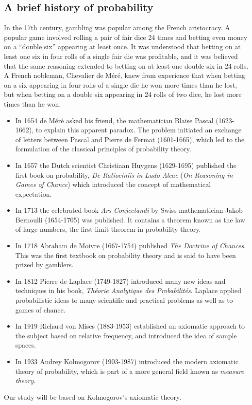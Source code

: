 \subsection*{A brief history of probability}\label{sec:history}

In the 17th century, gambling was popular among the French aristocracy. A popular game involved rolling a pair of fair dice 24 times and betting even money on a ``double six'' appearing at least once. It was understood that betting on at least one six in four rolls of a single fair die was profitable, and it was believed that the same reasoning extended to betting on at least one double six in 24 rolls. A French nobleman, Chevalier de M\'{e}r\'{e}, knew from experience that when betting on a six appearing in four rolls of a single die he won more times than he lost, but when betting on a double six appearing in 24 rolls of two dice, he lost more times than he won.
\begin{itemize}
\item
In 1654 de M\'{e}r\'{e} asked his friend, the mathematician Blaise Pascal (1623-1662), to explain this apparent paradox. The problem initiated an exchange of letters between Pascal and Pierre de Fermat (1601-1665), which led to the formulation of the classical principles of probability theory.
\item
In 1657 the Dutch scientist Christiaan Huygens (1629-1695) published the first book on probability, \textit{De Ratiociniis in Ludo Aleae} (\textit{On Reasoning in Games of Chance}) which introduced the concept of mathematical expectation.
\item
In 1713 the celebrated book \textit{Ars Conjectandi} by Swiss mathematician Jakob Bernoulli (1654-1705) was published. It contains a theorem known as the law of large numbers, the first limit theorem in probability theory. 
\item 
In 1718 Abraham de Moivre (1667-1754) published \textit{The Doctrine of Chances}. This was the first textbook on probability theory and is said to have been prized by gamblers.
\item 
In 1812 Pierre de Laplace (1749-1827) introduced many new ideas and techniques in his book, \textit{Th\'{e}orie Analytique des Probabilit\'{e}s}. Laplace applied probabilistic ideas to many scientific and practical problems as well as to games of chance. 
\item 
In 1919 Richard von Mises (1883-1953) established an axiomatic approach to the subject based on relative frequency, and introduced the idea of sample spaces.
\item
In 1933 Andrey Kolmogorov (1903-1987) introduced the modern axiomatic theory of probability, which is part of a more general field known as \emph{measure theory}.
\end{itemize}

Our study will be based on Kolmogorov's axiomatic theory.
